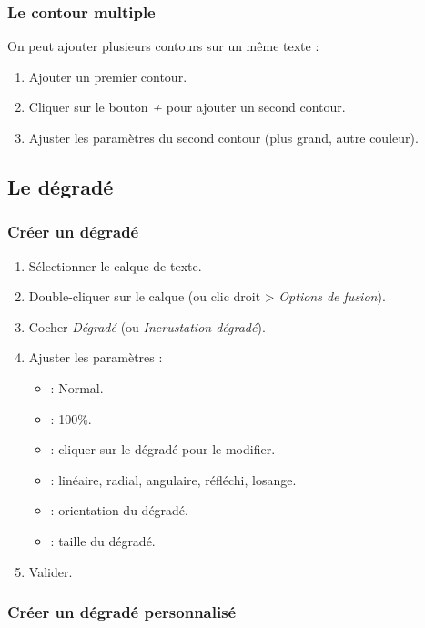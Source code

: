 \subsubsection{Le contour multiple}

On peut ajouter plusieurs contours sur un même texte :

\begin{enumerate}
    \item Ajouter un premier contour.
    \item Cliquer sur le bouton \emph{+} pour ajouter un second contour.
    \item Ajuster les paramètres du second contour (plus grand, autre couleur).
\end{enumerate}

\subsection{Le dégradé}

\subsubsection{Créer un dégradé}

\begin{enumerate}
    \item Sélectionner le calque de texte.
    \item Double-cliquer sur le calque (ou clic droit > \emph{Options de fusion}).
    \item Cocher \emph{Dégradé} (ou \emph{Incrustation dégradé}).
    \item Ajuster les paramètres :
    \begin{itemize}
        \item {} : Normal.
        \item {} : 100\%.
        \item {} : cliquer sur le dégradé pour le modifier.
        \item {} : linéaire, radial, angulaire, réfléchi, losange.
        \item {} : orientation du dégradé.
        \item {} : taille du dégradé.
    \end{itemize}
    \item Valider.
\end{enumerate}

\subsubsection{Créer un dégradé personnalisé}

